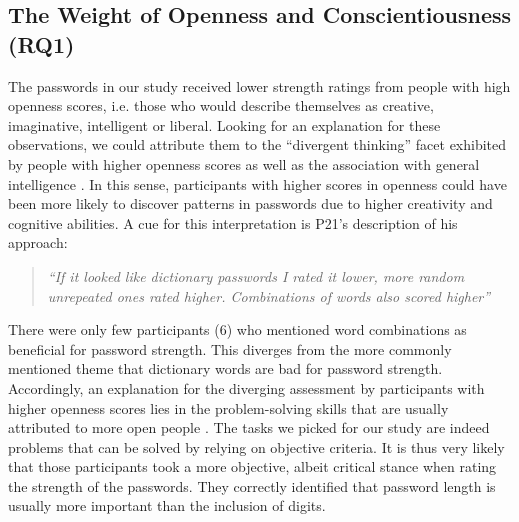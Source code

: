 

\subsection{The Weight of Openness and Conscientiousness (RQ1)}
The passwords in our study received lower strength ratings from people with high openness scores, i.e. those who would describe themselves as creative, imaginative, intelligent or liberal. %
Looking for an explanation for these observations, we could attribute them to the ``divergent thinking'' facet exhibited by people with higher openness scores \cite{McCrae1987DivergentThinking} as well as the association with general intelligence \cite{DeYoung2015}. In this sense, participants with higher scores in openness could have been more likely to discover patterns in passwords due to higher creativity and cognitive abilities. A cue for this interpretation is P21's description of his approach: 
\begin{quote}
	\textit{``If it looked like dictionary passwords I rated it lower, more random unrepeated ones rated higher. Combinations of words also scored higher''}
\end{quote}
There were only few participants (6) who mentioned word combinations as beneficial for password strength. This diverges from the more commonly mentioned theme that dictionary words are bad for password strength. Accordingly, an explanation for the diverging assessment by participants with higher openness scores lies in the problem-solving skills that are usually attributed to more open people \cite{DeYoung2015, McCrae1987DivergentThinking}. The tasks we picked for our study are indeed problems that can be solved by relying on objective criteria. It is thus very likely that those participants took a more objective, albeit critical stance when rating the strength of the passwords. They correctly identified that password length is usually more important than the inclusion of digits. 

